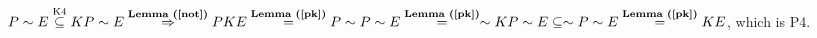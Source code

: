 \begin{pr}[12.12.4]
$P\sim E\overtext{K4}\subseteq KP\sim E\\
\overtext{\rflm{not}}\then PKE\overtext{\rflm{pk}}=P\sim P\sim E\overtext{\rflm{pk}}=\sim KP\sim E\subseteq\sim P\sim E\overtext{\rflm{pk}}=KE$, which is P4.
\end{pr}
